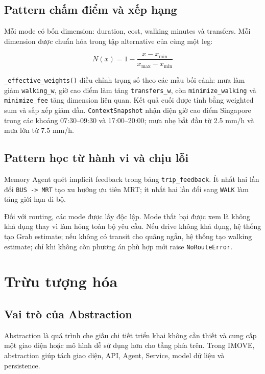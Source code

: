 \documentclass[12pt,a4paper]{article}
\begin{document}
\subsection{Pattern chấm điểm và xếp hạng}


Mỗi mode có bốn dimension: duration, cost, walking minutes và transfers. Mỗi dimension được chuẩn hóa trong tập alternative của cùng một leg:

\[
N(x) = 1 - \frac{x - x_{\min}}{x_{\max} - x_{\min}}
\]

\texttt{\_effective\_weights()} điều chỉnh trọng số theo các mẫu bối cảnh: mưa làm giảm \texttt{walking\_w}, giờ cao điểm làm tăng \texttt{transfers\_w}, còn \texttt{minimize\_walking} và \texttt{minimize\_fee} tăng dimension liên quan. Kết quả cuối được tính bằng weighted sum và sắp xếp giảm dần. \texttt{ContextSnapshot} nhận diện giờ cao điểm Singapore trong các khoảng 07:30--09:30 và 17:00--20:00; mưa nhẹ bắt đầu từ 2.5 mm/h và mưa lớn từ 7.5 mm/h.

\subsection{Pattern học từ hành vi và chịu lỗi}


Memory Agent quét implicit feedback trong bảng \texttt{trip\_feedback}. Ít nhất hai lần đổi \texttt{BUS -> MRT} tạo xu hướng ưu tiên MRT; ít nhất hai lần đổi sang \texttt{WALK} làm tăng giới hạn đi bộ.

Đối với routing, các mode được lấy độc lập. Mode thất bại được xem là không khả dụng thay vì làm hỏng toàn bộ yêu cầu. Nếu drive không khả dụng, hệ thống tạo Grab estimate; nếu không có transit cho quãng ngắn, hệ thống tạo walking estimate; chỉ khi không còn phương án phù hợp mới raise \texttt{NoRouteError}.

\section{Trừu tượng hóa}

\subsection{Vai trò của Abstraction}


Abstraction là quá trình che giấu chi tiết triển khai không cần thiết và cung cấp một giao diện hoặc mô hình dễ sử dụng hơn cho tầng phía trên. Trong IMOVE, abstraction giúp tách giao diện, API, Agent, Service, model dữ liệu và persistence.
\end{document}
